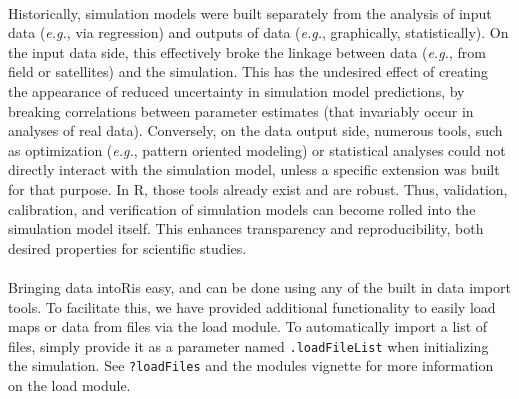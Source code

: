 \documentclass{article}
\begin{document}
\paragraph{}
Historically, simulation models were built separately from the analysis of input data (\textit{e.g.}, via regression) and outputs of data (\textit{e.g.}, graphically, statistically). On the input data side, this effectively broke the linkage between data (\textit{e.g.}, from field or satellites) and the simulation. This has the undesired effect of creating the appearance of reduced uncertainty in simulation model predictions, by breaking correlations between parameter estimates (that invariably occur in analyses of real data). Conversely, on the data output side, numerous tools, such as optimization (\textit{e.g.}, pattern oriented modeling) or statistical analyses could not directly interact with the simulation model, unless a specific extension was built for that purpose. In R, those tools already exist and are robust. Thus, validation, calibration, and verification of simulation models can become rolled into the simulation model itself. This enhances transparency and reproducibility, both desired properties for scientific studies.

\paragraph{}
Bringing data into\textsf{R}is easy, and can be done using any of the built in data import tools. To facilitate this, we have provided additional functionality to easily load maps or data from files via the load module. To automatically import a list of files, simply provide it as a parameter named \texttt{.loadFileList} when initializing the simulation. See \texttt{?loadFiles} and the modules vignette for more information on the load module.
\end{document}
